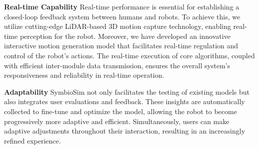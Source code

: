 \textbf{Real-time Capability}
Real-time performance is essential for establishing a closed-loop feedback system between humans and robots. To achieve this, we utilize cutting-edge LiDAR-based 3D motion capture technology, enabling real-time perception for the robot. Moreover, we have developed an innovative interactive motion generation model that facilitates real-time regulation and control of the robot’s actions. The real-time execution of core algorithms, coupled with efficient inter-module data transmission, ensures the overall system’s responsiveness and reliability in real-time operation.


\textbf{Adaptability} SymbioSim not only facilitates the testing of existing models but also integrates user evaluations and feedback. These insights are automatically collected to fine-tune and optimize the model, allowing the robot to become progressively more adaptive and efficient. Simultaneously, users can make adaptive adjustments throughout their interaction, resulting in an increasingly refined experience.
